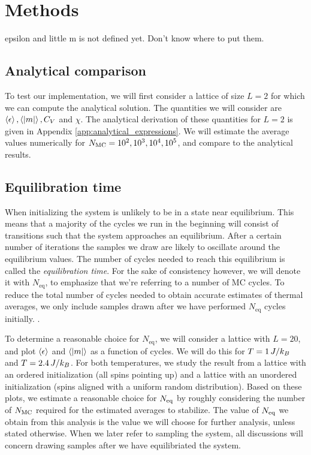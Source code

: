 \section{Methods}\label{sec:methods}
\alert{epsilon and little m is not defined yet. Don't know where to put them.}

\subsection{Analytical comparison}\label{subsec_methods:analytical_test}
To test our implementation, we will first consider a lattice of size $L=2$ for which we can compute the analytical solution. The quantities we will consider are $\expval{\epsilon},\expval{\abs{m}},C_V$ and $\chi$. The analytical derivation of these quantities for $L=2$ is given in Appendix \ref{app:analytical_expressions}. We will estimate the average values numerically for $N_\mathrm{MC}=10^2,10^3,10^4,10^5$, and compare to the analytical results.

\subsection{Equilibration time}\label{subsec_methods:equilibration_time}
When initializing the system is unlikely to be in a state near equilibrium. This means that a majority of the cycles we run in the beginning will consist of transitions such that the system approaches an equilibrium. After a certain number of iterations the samples we draw are likely to oscillate around the equilibrium values. The number of cycles needed to reach this equilibrium is called the \textit{equilibration time}. For the sake of consistency however, we will denote it with $N_\mathrm{eq}$, to emphasize that we're referring to a number of MC cycles. To reduce the total number of cycles needed to obtain accurate estimates of thermal averages, we only include samples drawn after we have performed $N_\mathrm{eq}$ cycles initially. . 

To determine a reasonable choice for $N_\mathrm{eq}$, we will consider a lattice with $L=20$, and plot $\expval{\epsilon}$ and $\expval{\abs{m}}$ as a function of cycles. We will do this for $T=1\,J/k_B$ and $T=2.4\,J/k_B$. For both temperatures, we study the result from a lattice with an ordered initialization (all spins pointing up) and a lattice with an unordered initialization (spins aligned with a uniform random distribution). Based on these plots, we estimate a reasonable choice for $N_\mathrm{eq}$ by roughly considering the number of $N_\mathrm{MC}$ required for the estimated averages to stabilize. The value of $N_\mathrm{eq}$ we obtain from this analysis is the value we will choose for further analysis, unless stated otherwise. When we later refer to sampling the system, all discussions will concern drawing samples after we have equilibriated the system.     

